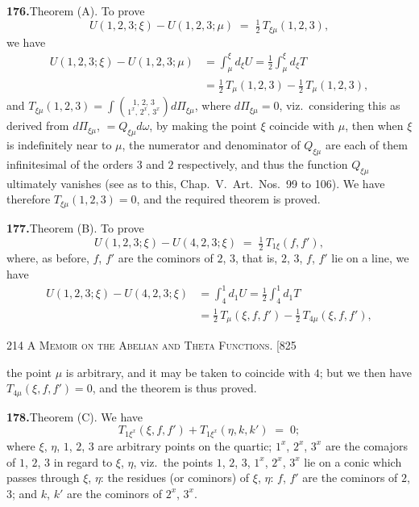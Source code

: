 \documentclass[11pt]{article}
\begin{document}
\textbf{176.}\quad Theorem (A). To prove
\begin{equation*}
U(1,2,3;\xi) - U(1,2,3;\mu) \;=\; \tfrac{1}{2}\,T_{\xi\mu}(1,2,3),\tag{A}
\end{equation*}
we have
\begin{align*}
U(1,2,3;\xi)-U(1,2,3;\mu) &= \int_{\mu}^{\xi}d_{\xi}U = \tfrac{1}{2}\!\int_{\mu}^{\xi}d_{\xi}T\\
                          &= \tfrac{1}{2}\,T_{\mu}(1,2,3)-\tfrac{1}{2}\,T_{\mu}(1,2,3),
\end{align*}
and $T_{\xi\mu}(1,2,3) = \displaystyle\int\!\binom{1,\,2,\,3}{1^{x},\,2^{x},\,3^{x}}d\Pi_{\xi\mu}$, where $d\Pi_{\xi\mu} = 0$, viz.\ considering this as derived
from $d\Pi_{\xi\mu}$, $= Q_{\xi\mu}d\omega$, by making the point $\xi$ coincide with $\mu$, then when $\xi$ is indefinitely
near to $\mu$, the numerator and denominator of $Q_{\xi\mu}$ are each of them infinitesimal of
the orders $3$ and $2$ respectively, and thus the function $Q_{\xi\mu}$ ultimately vanishes (see as
to this, Chap.~V.\ Art.\ Nos.\ 99 to 106).  We have therefore $T_{\xi\mu}(1,2,3) = 0$, and the
required theorem is proved.

\medskip
\textbf{177.}\quad Theorem (B). To prove
\begin{equation*}
U(1,2,3;\xi) - U(4,2,3;\xi) \;=\; \tfrac{1}{2}\,T_{1\xi}(f,f'),\tag{B}
\end{equation*}
where, as before, $f$, $f'$ are the cominors of $2$, $3$, that is, $2$, $3$, $f$, $f'$ lie on a line, we have
\begin{align*}
U(1,2,3;\xi)-U(4,2,3;\xi) &= \int_{4}^{1}d_{1}U = \tfrac{1}{2}\!\int_{4}^{1}d_{1}T\\
                          &= \tfrac{1}{2}\,T_{\mu}(\xi,f,f')-\tfrac{1}{2}\,T_{4\mu}(\xi,f,f'),
\end{align*}

\newpage
\noindent\textsc{214 \hfill A Memoir on the Abelian and Theta Functions. \hfill [825}
\vspace{0.6em}

\noindent
the point $\mu$ is arbitrary, and it may be taken to coincide with $4$; but we then have
$T_{4\mu}(\xi,f,f') = 0$, and the theorem is thus proved.

\medskip
\textbf{178.}\quad Theorem (C). We have
\begin{equation*}
T_{1\xi^{x}}(\xi,f,f') + T_{1\xi^{x}}(\eta,k,k') \;=\; 0;\tag{C}
\end{equation*}
where $\xi$, $\eta$, $1$, $2$, $3$ are arbitrary points on the quartic; $1^{x}$, $2^{x}$, $3^{x}$ are the comajors
of $1$, $2$, $3$ in regard to $\xi$, $\eta$, viz.\ the points $1$, $2$, $3$, $1^{x}$, $2^{x}$, $3^{x}$ lie on a conic which
passes through $\xi$, $\eta$: the residues (or cominors) of $\xi$, $\eta$: $f$, $f'$ are the cominors of
$2$, $3$; and $k$, $k'$ are the cominors of $2^{x}$, $3^{x}$.
\end{document}
